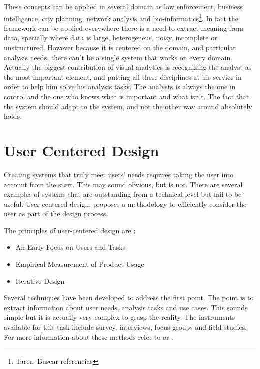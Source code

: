 These concepts can be applied in several domain as law enforcement, business intelligence, city planning, network analysis and bio-informatics\footnote{Tarea: Buscar referencias}. In fact the framework can be applied everywhere there is a need to extract meaning from data, specially where data is large, heterogeneus, noisy, incomplete or unstructured. However because it is centered on the domain, and particular analysis needs, there can't be a single system that works on every domain. Actually the biggest contribution of visual analytics is recognizing the analyst as the most important element, and putting all these disciplines at his service in order to help him solve his analysis tasks. The analysts is always the one in control and the one who knows what is important and what isn't. The fact that the system should adapt to the system, and not the other way around \autocite{norman_design_2002} absolutely holds. 

\section{User Centered Design}

Creating systems that truly meet users' needs requires taking the user into account from the start. This may sound obvious, but is not. There are several examples of systems that are outstanding from a technical level but fail to be useful\autocite{norman_design_2002}. User centered design\autocite{baxter_understanding_2005}, proposes a methodology to efficiently consider the user as part of the design process. 

The principles of user-centered design are \autocite{baxter_understanding_2005}:

\begin{itemize}
	\item An Early Focus on Users and Tasks
	\item Empirical Measurement of Product Usage
	\item Iterative Design
\end{itemize}


Several techniques have been developed to address the first point. The point is to extract information about user needs, analysis tasks and use cases. This sounds simple but it is actually very complex to grasp the reality. The instruments available for this task include survey, interviews, focus groups and field studies. For more information about these methods refer to \autocite{baxter_understanding_2005} or \autocite{hartson_ux_2012}.

